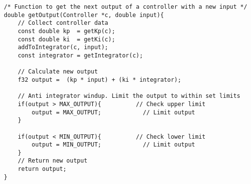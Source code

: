 \begin{lstlisting}[style=c, caption=Implementation of PI-controller 'get output'-function., label=code:pi_controller3]
/* Function to get the next output of a controller with a new input */
double getOutput(Controller *c, double input){
	// Collect controller data
	const double kp  = getKp(c);
	const double ki  = getKi(c);
	addToIntegrator(c, input);
	const integrator = getIntegrator(c);

	// Calculate new output
	f32 output =  (kp * input) + (ki * integrator);

	// Anti integrator windup. Limit the output to within set limits
	if(output > MAX_OUTPUT){          // Check upper limit
		output = MAX_OUTPUT;            // Limit output
	}
	
	if(output < MIN_OUTPUT){          // Check lower limit
		output = MIN_OUTPUT;            // Limit output
	}	
	// Return new output
	return output;
}
\end{lstlisting}

